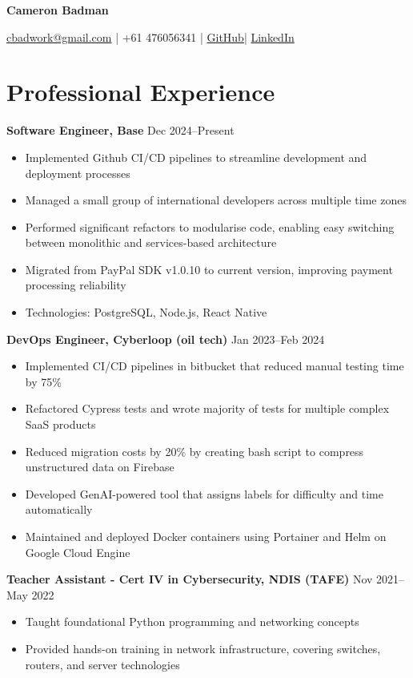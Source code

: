 \documentclass[10pt,a4paper]{article}
\begin{document}
	\begin{center}
		{\huge\textbf{Cameron Badman}}
		\begin{center}
			\href{mailto:cbadwork@gmail.com}{cbadwork@gmail.com} |
			+61 476056341 |
			\href{https://github.com/CameronBadman}{GitHub}| 
			\href{https://www.linkedin.com/in/cameron-badman-5314ba1b8/}{LinkedIn}
		\end{center}
	\end{center}
	
	\section{Professional Experience}
	\textbf{Software Engineer, Base} \hfill Dec 2024--Present 
	\begin{itemize}[label=\textbullet, itemsep=0.02cm]
		\item Implemented Github CI/CD pipelines to streamline development and deployment processes
		\item Managed a small group of international developers across multiple time zones
		\item Performed significant refactors to modularise code, enabling easy switching between monolithic and services-based architecture
		\item Migrated from PayPal SDK v1.0.10 to current version, improving payment processing reliability
		\item Technologies: PostgreSQL, Node.js, React Native
	\end{itemize}
	
	\textbf{DevOps Engineer, Cyberloop (oil tech)} \hfill Jan 2023--Feb 2024 
	\begin{itemize}[label=\textbullet, itemsep=0.02cm]
		\item Implemented CI/CD pipelines in bitbucket that reduced manual testing time by 75\%
		\item Refactored Cypress tests and wrote majority of tests for multiple complex SaaS products
		\item Reduced migration costs by 20\% by creating bash script to compress unstructured data on Firebase
		\item Developed GenAI-powered tool that assigns labels for difficulty and time automatically
		\item Maintained and deployed Docker containers using Portainer and Helm on Google Cloud Engine
	\end{itemize}
	
	\textbf{Teacher Assistant - Cert IV in Cybersecurity, NDIS (TAFE)} \hfill Nov 2021--May 2022 
	\begin{itemize}[label=\textbullet, itemsep=0.02cm]
		\item Taught foundational Python programming and networking concepts
		\item Provided hands-on training in network infrastructure, covering switches, routers, and server technologies
	\end{itemize}
	
\end{document}
